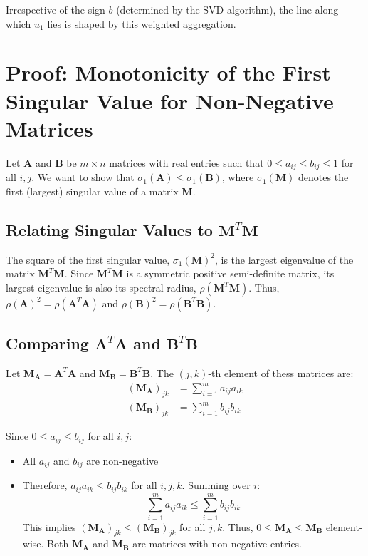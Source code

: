 Irrespective of the sign $b$ (determined by the SVD algorithm), the line along
which $u_1$ lies is shaped by this weighted aggregation.

\section{Proof: Monotonicity of the First Singular Value for Non-Negative Matrices}
\label{sec:app-monotonicity}
Let $\mathbf{A}$ and $\mathbf{B}$ be $m \times n$ matrices with real entries
such that $0 \leq a_{ij} \leq b_{ij} \leq 1$ for all $i,j$. We want to show that
$\sigma_1(\mathbf{A}) \leq \sigma_1(\mathbf{B})$, where $\sigma_1(\mathbf{M})$
denotes the first (largest) singular value of a matrix $\mathbf{M}$.

\subsection{Relating Singular Values to $\mathbf{M}^T\mathbf{M}$}
\label{sec:mono-one}
The square of the first singular value, $\sigma_1(\mathbf{M})^2$, is the largest
eigenvalue of the matrix $\mathbf{M}^T\mathbf{M}$. Since
$\mathbf{M}^T\mathbf{M}$ is a symmetric positive semi-definite matrix, its
largest eigenvalue is also its spectral radius, $\rho(\mathbf{M}^T\mathbf{M})$.
Thus, $\rho(\mathbf{A})^2 = \rho(\mathbf{A}^T\mathbf{A})$ and
$\rho(\mathbf{B})^2 = \rho(\mathbf{B}^T\mathbf{B})$.

\subsection{Comparing $\mathbf{A}^T\mathbf{A}$ and $\mathbf{B}^T\mathbf{B}$}
Let $\mathbf{M}_{\mathbf{A}} = \mathbf{A}^T\mathbf{A}$ and
$\mathbf{M}_{\mathbf{B}} = \mathbf{B}^T\mathbf{B}$. The $(j,k)$-th element of
thess matrices are:
\begin{align}
    (\mathbf{M}_{\mathbf{A}})_{jk} &= \sum_{i=1}^m a_{ij}a_{ik} \\
    (\mathbf{M}_{\mathbf{B}})_{jk} &= \sum_{i=1}^m b_{ij}b_{ik}
\end{align}

Since $0 \leq a_{ij} \leq b_{ij}$ for all $i,j$:
\begin{itemize}
    \item All $a_{ij}$ and $b_{ij}$ are non-negative
    \item Therefore, $a_{ij}a_{ik} \leq b_{ij}b_{ik}$ for all $i,j,k$. Summing
        over $i$:
        \[ \sum_{i=1}^m a_{ij}a_{ik} \leq \sum_{i=1}^m b_{ij}b_{ik} \]
        This implies $(\mathbf{M}_{\mathbf{A}})_{jk} \leq
        (\mathbf{M}_{\mathbf{B}})_{jk}$ for all $j,k$. Thus, $0 \leq
        \mathbf{M}_{\mathbf{A}} \leq \mathbf{M}_{\mathbf{B}}$ element-wise. Both
        $\mathbf{M}_{\mathbf{A}}$ and $\mathbf{M}_{\mathbf{B}}$ are matrices
        with non-negative entries.
\end{itemize}

